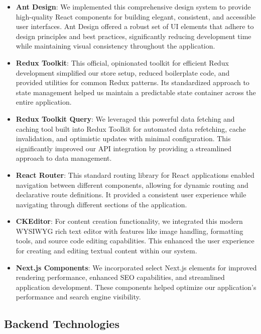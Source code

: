 \begin{itemize}
    \item \textbf{Ant Design}: We implemented this comprehensive design system to provide high-quality React components for building elegant, consistent, and accessible user interfaces. Ant Design offered a robust set of UI elements that adhere to design principles and best practices, significantly reducing development time while maintaining visual consistency throughout the application.

    \item \textbf{Redux Toolkit}: This official, opinionated toolkit for efficient Redux development simplified our store setup, reduced boilerplate code, and provided utilities for common Redux patterns. Its standardized approach to state management helped us maintain a predictable state container across the entire application.

    \item \textbf{Redux Toolkit Query}: We leveraged this powerful data fetching and caching tool built into Redux Toolkit for automated data refetching, cache invalidation, and optimistic updates with minimal configuration. This significantly improved our API integration by providing a streamlined approach to data management.

    \item \textbf{React Router}: This standard routing library for React applications enabled navigation between different components, allowing for dynamic routing and declarative route definitions. It provided a consistent user experience while navigating through different sections of the application.

    \item \textbf{CKEditor}: For content creation functionality, we integrated this modern WYSIWYG rich text editor with features like image handling, formatting tools, and source code editing capabilities. This enhanced the user experience for creating and editing textual content within our system.

    \item \textbf{Next.js Components}: We incorporated select Next.js elements for improved rendering performance, enhanced SEO capabilities, and streamlined application development. These components helped optimize our application's performance and search engine visibility.
\end{itemize}

\subsection{Backend Technologies}

